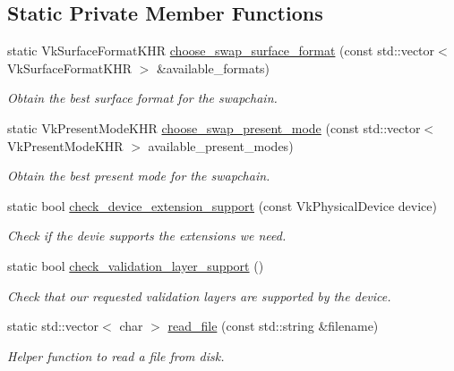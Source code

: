 \subsection*{Static Private Member Functions}
\begin{DoxyCompactItemize}
\item 
static Vk\+Surface\+Format\+K\+HR \mbox{\hyperlink{classvulkan__application_ae3a147ea9e78ef40044f715debd47f9d}{choose\+\_\+swap\+\_\+surface\+\_\+format}} (const std\+::vector$<$ Vk\+Surface\+Format\+K\+HR $>$ \&available\+\_\+formats)
\begin{DoxyCompactList}\small\item\em Obtain the best surface format for the swapchain. \end{DoxyCompactList}\item 
static Vk\+Present\+Mode\+K\+HR \mbox{\hyperlink{classvulkan__application_ae5d3e32c1119dcf663b76b00f49292a9}{choose\+\_\+swap\+\_\+present\+\_\+mode}} (const std\+::vector$<$ Vk\+Present\+Mode\+K\+HR $>$ available\+\_\+present\+\_\+modes)
\begin{DoxyCompactList}\small\item\em Obtain the best present mode for the swapchain. \end{DoxyCompactList}\item 
static bool \mbox{\hyperlink{classvulkan__application_a00607f561b3ff3cf7ec587dd0f539731}{check\+\_\+device\+\_\+extension\+\_\+support}} (const Vk\+Physical\+Device device)
\begin{DoxyCompactList}\small\item\em Check if the devie supports the extensions we need. \end{DoxyCompactList}\item 
static bool \mbox{\hyperlink{classvulkan__application_ab0ebd85ecb91dbfa14def023e17ed09e}{check\+\_\+validation\+\_\+layer\+\_\+support}} ()
\begin{DoxyCompactList}\small\item\em Check that our requested validation layers are supported by the device. \end{DoxyCompactList}\item 
static std\+::vector$<$ char $>$ \mbox{\hyperlink{classvulkan__application_ac0e61a90deaf38512932e9f59c2ab9ca}{read\+\_\+file}} (const std\+::string \&filename)
\begin{DoxyCompactList}\small\item\em Helper function to read a file from disk. \end{DoxyCompactList}\end{DoxyCompactItemize}
